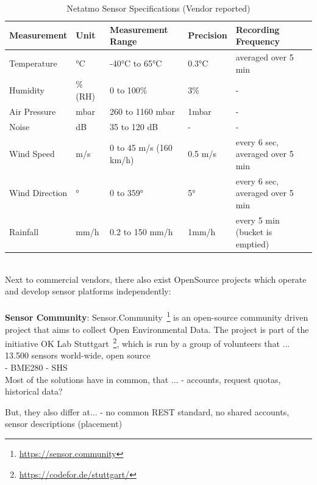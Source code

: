 \begin{table}[]
\begin{tabular}{@{}lllll@{}}
\toprule
Measurement    & Unit    & Measurement Range      & Precision  & Recording Frequency              \\ \midrule
Temperature    & °C      & -40°C to 65°C          & 0.3°C   & averaged over 5 min              \\
Humidity       & \% (RH) & 0 to 100\%             & 3\%     & -                                \\
Air Pressure   & mbar    & 260 to 1160 mbar       & 1mbar   & -                                \\
Noise          & dB      & 35 to 120 dB           & -       & -                                \\
Wind Speed     & m/s     & 0 to 45 m/s (160 km/h) & 0.5 m/s & every 6 sec, averaged over 5 min \\
Wind Direction & °       & 0 to 359°              & 5°      & every 6 sec, averaged over 5 min \\
Rainfall       & mm/h    & 0.2 to 150 mm/h        & 1mm/h   & every 5 min (bucket is emptied)  \\ \bottomrule
\end{tabular}
\caption{Netatmo Sensor Specifications (Vendor reported)}
\label{tab: netatmo sensor specs}
\end{table}

\\
Next to commercial vendors, there also exist OpenSource projects which operate and develop sensor platforms independently:\\
\\
\textbf{Sensor Community}: Sensor.Community~\footnote{\url{https://sensor.community}} is an open-source community driven project that aims to collect Open Environmental Data. The project is part of the initiative OK Lab Stuttgart~\footnote{\url{https://codefor.de/stuttgart/}}, which is run by a group of volunteers that ...
13.500 sensors world-wide, open source\\
- BME280
- SHS 
\\
Most of the solutions have in common, that ...
- accounts, request quotas, historical data?

But, they also differ at...
- no common REST standard, no shared accounts, sensor descriptions (placement)

